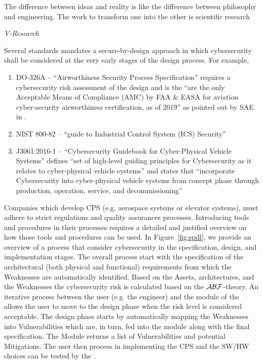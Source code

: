 \epigraph{The difference between ideas and reality is like the
difference between philosophy and engineering. The work to transform one into
the other is scientific research}{{\itshape V-Research}}

Several standards mandates a secure-by-design approach in which 
cybersecurity shall be considered at the very early stages of the 
design process. For example,
\begin{enumerate}[noitemsep]
	\item DO-326A -- ``Airworthiness Security Process Specification''
		requires a cybersecurity risk assessment of the design and is
		the ``are the only Acceptable Means of Compliance (AMC) by FAA
		\& EASA for aviation cyber-security airworthiness certification,
		as of 2019'' as pointed out by SAE in \autocite{SAE2019DO326A}.
	\item NIST 800-82 \autocite{Stouffer2011guide} -- ``guide to Industrial
		Control System (ICS) Security''
	\item J3061:2016-1 \autocite{SAE2016J3061} -- ``Cybersecurity Guidebook
		for Cyber-Physical Vehicle Systems'' defines ``set of
		high-level guiding principles for Cybersecurity as it relates
		to cyber-physical vehicle systems'' and states that
		``incorporate Cybersecurity into cyber-physical vehicle systems
		from concept phase through production, operation, service, and
		decommissioning''
\end{enumerate}
Companies which develop CPS (e.g. aerospace systems or elevator systems), must adhere
to strict regulations and quality assurances processes. Introducing tools and procedures 
in their processes requires a detailed and justified overview on how those
tools and procedures can be used. In Figure~\ref{fig:spdl}, we provide an overview
of a process that consider cybersecurity in the specification, design, and implementation
stages. The overall process start with the specification of the architectural (both physical
and functional) requirements from which the Weaknesses are automatically identified.
Based on the Assets, architectures, and the Weaknesses the cybersecurity risk is
calculated based on the $\mathcal{A}\mathcal{B}\mathcal{F}$-theory. An iterative process between 
the user (e.g. the engineer) and the \secramod{} module of the \abftool{} allows the user to move to the design phase
when the risk level is considered acceptable. The design phase starts by automatically mapping
the Weaknesses into Vulnerabilities which are, in turn, fed into the \designverifmod{}
module along with the final specification. The Module returns a list of Vulnerabilities and
potential Mitigations. The user then procees in implementing the CPS and the SW/HW choices
can be tested by the \atgmod. 

